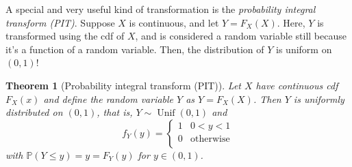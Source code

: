 \documentclass[
]{book}
\DeclareMathOperator{\Unif}{Unif}
\newcommand{\bbP}{\mathbb{P}}
\newtheorem{theorem}{Theorem}[chapter]
\theoremstyle{definition}
\theoremstyle{definition}
\theoremstyle{definition}
\theoremstyle{definition}
\theoremstyle{remark}
\begin{document}
A special and very useful kind of transformation is the \emph{probability integral transform (PIT)}.
Suppose \(X\) is continuous, and let \(Y=F_X(X)\).
Here, \(Y\) is transformed using the cdf of \(X\), and is considered a random variable still because it's a function of a random variable.
Then, the distribution of \(Y\) is uniform on \((0,1)\)!

\begin{theorem}[Probability integral transform (PIT)]
Let \(X\) have continuous cdf \(F_X(x)\) and define the random variable \(Y\) as \(Y=F_X(X)\). Then \(Y\) is uniformly distributed on \((0,1)\), that is, \(Y\sim\Unif(0,1)\) and
\[
f_Y(y) = \begin{cases}
1 & 0<y<1\\
0 & \text{otherwise} \\
\end{cases}
\]
with \(\bbP(Y\leq y)=y=F_Y(y)\) for \(y\in(0,1)\).
\end{theorem}
\end{document}
